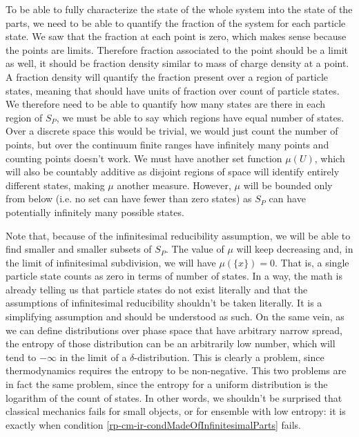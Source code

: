 To be able to fully characterize the state of the whole system into the state of the parts, we need to be able to quantify the fraction of the system for each particle state. We saw that the fraction at each point is zero, which makes sense because the points are limits. Therefore fraction associated to the point should be a limit as well, it should be fraction density similar to mass of charge density at a point. A fraction density will quantify the fraction present over a region of particle states, meaning that should have units of fraction over count of particle states. We therefore need to be able to quantify how many states are there in each region of $S_P$, we must be able to say which regions have equal number of states. Over a discrete space this would be trivial, we would just count the number of points, but over the continuum finite ranges have infinitely many points and counting points doesn't work. We must have another set function $\mu(U)$, which will also be countably additive as disjoint regions of space will identify entirely different states, making $\mu$ another measure. However, $\mu$ will be bounded only from below (i.e. no set can have fewer than zero states) as $S_P$ can have potentially infinitely many possible states.

Note that, because of the infinitesimal reducibility assumption, we will be able to find smaller and smaller subsets of $S_P$. The value of $\mu$ will keep decreasing and, in the limit of infinitesimal subdivision, we will have $\mu(\{x\})=0$. That is, a single particle state counts as zero in terms of number of states. In a way, the math is already telling us that particle states do not exist literally and that the assumptions of infinitesimal reducibility shouldn't be taken literally. It is a simplifying assumption and should be understood as such. On the same vein, as we can define distributions over phase space that have arbitrary narrow spread, the entropy of those distribution can be an arbitrarily low number, which will tend to $-\infty$ in the limit of a $\delta$-distribution. This is clearly a problem, since thermodynamics requires the entropy to be non-negative. This two problems are in fact the same problem, since the entropy for a uniform distribution is the logarithm of the count of states. In other words, we shouldn't be surprised that classical mechanics fails for small objects, or for ensemble with low entropy: it is exactly when condition \ref{rp-cm-ir-condMadeOfInfinitesimalParts} fails.

